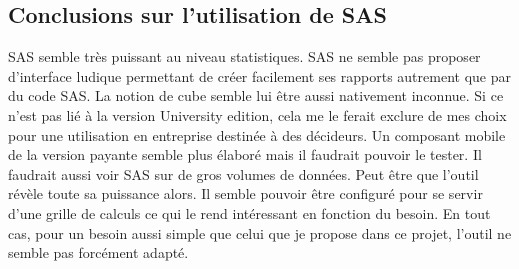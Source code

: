 \subsection{Conclusions sur l'utilisation de SAS}
SAS semble très puissant au niveau statistiques. SAS ne semble pas proposer d'interface ludique permettant de créer facilement ses rapports autrement que par du code SAS. La notion de cube semble lui être aussi nativement inconnue. Si ce n'est pas lié à la version University edition, cela me le ferait exclure de mes choix pour une utilisation en entreprise destinée à des décideurs. Un composant mobile de la version payante semble plus élaboré mais il faudrait pouvoir le tester. Il faudrait aussi voir SAS sur de gros volumes de données. Peut être que l'outil révèle toute sa puissance alors. Il semble pouvoir être configuré pour se servir d'une grille de calculs ce qui le rend intéressant en fonction du besoin. En tout cas, pour un besoin aussi simple que celui que je propose dans ce projet, l'outil ne semble pas forcément adapté. 

\clearpage